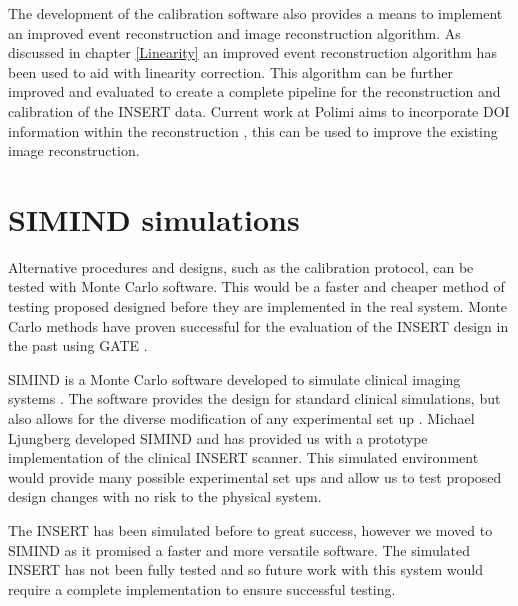 The development of the calibration software also provides a means to implement an improved event reconstruction and image reconstruction algorithm. As discussed in chapter \ref{Linearity} an improved event reconstruction algorithm has been used to aid with linearity correction. This algorithm can be further improved and evaluated to create a complete pipeline for the reconstruction and calibration of the \acrshort{INSERT} data. Current work at Polimi aims to incorporate \acrshort{DOI} information within the reconstruction \cite{MASSARA2018ProcessingSystem}, this can be used to improve the existing image reconstruction. 

\section{SIMIND simulations}
Alternative procedures and designs, such as the calibration protocol, can be tested with Monte Carlo software. This would be a faster and cheaper method of testing proposed designed before they are implemented in the real system. Monte Carlo methods have proven successful for the evaluation of the \acrshort{INSERT} design in the past using GATE \cite{1236960} \cite{Busca2014SimulationImaging}.

SIMIND is a Monte Carlo software developed to simulate clinical imaging systems \cite{LJUNGBERG1989257}. The software provides the design for standard clinical simulations, but also allows for the diverse modification of any experimental set up \cite{Gustafsson2018MonteFramework}. Michael Ljungberg developed SIMIND and has provided us with a prototype implementation of the clinical \acrshort{INSERT} scanner. This simulated environment would provide many possible experimental set ups and allow us to test proposed design changes with no risk to the physical system. 

The \acrshort{INSERT} has been simulated before to great success, however we moved to SIMIND as it promised a faster and more versatile software. The simulated \acrshort{INSERT} has not been fully tested and so future work with this system would require a complete implementation to ensure successful testing. 


